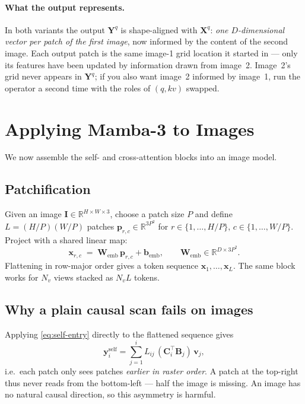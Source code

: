 \documentclass[11pt,a4paper]{article}
\begin{document}
\paragraph{What the output represents.}
In both variants the output $\bm{Y}^q$ is shape-aligned with
$\bm{X}^{q}$: \emph{one $D$-dimensional vector per patch of the first
image}, now informed by the content of the second image. Each
output patch is the same image-1 grid location it started in — only
its features have been updated by information drawn from image~2.
Image~2's grid never appears in $\bm{Y}^q$; if you also want
image~2 informed by image~1, run the operator a second time with the
roles of $(q, kv)$ swapped.

\section{Applying Mamba-3 to Images}
\label{sec:images}

We now assemble the self- and cross-attention blocks into an image
model.

\subsection{Patchification}

Given an image $\bm{I}\in\mathbb{R}^{H\times W\times 3}$, choose a
patch size $P$ and define $L = (H/P)(W/P)$ patches
$\bm{p}_{r,c}\in\mathbb{R}^{3P^2}$ for
$r\in\{1,\dots,H/P\},\,c\in\{1,\dots,W/P\}$. Project with a shared
linear map:
\begin{equation}\label{eq:patch-embed}
  \bm{x}_{r,c} \;=\; \bm{W}_{\text{emb}}\,\bm{p}_{r,c} + \bm{b}_{\text{emb}},
  \qquad \bm{W}_{\text{emb}}\in\mathbb{R}^{D\times 3P^2}.
\end{equation}
Flattening in row-major order gives a token sequence
$\bm{x}_1,\dots,\bm{x}_L$. The same block works for $N_v$ views
stacked as $N_v L$ tokens.

\subsection{Why a plain causal scan fails on images}

Applying \eqref{eq:self-entry} directly to the flattened sequence
gives
\begin{equation}
  \bm{y}_i^{\text{self}} = \sum_{j=1}^{i} L_{ij}\,(\bm{C}_i^\top\bm{B}_j)\,\bm{v}_j,
\end{equation}
i.e.\ each patch only sees patches \emph{earlier in raster order}.
A patch at the top-right thus never reads from the bottom-left — half
the image is missing. An image has no natural causal direction, so
this asymmetry is harmful.
\end{document}
